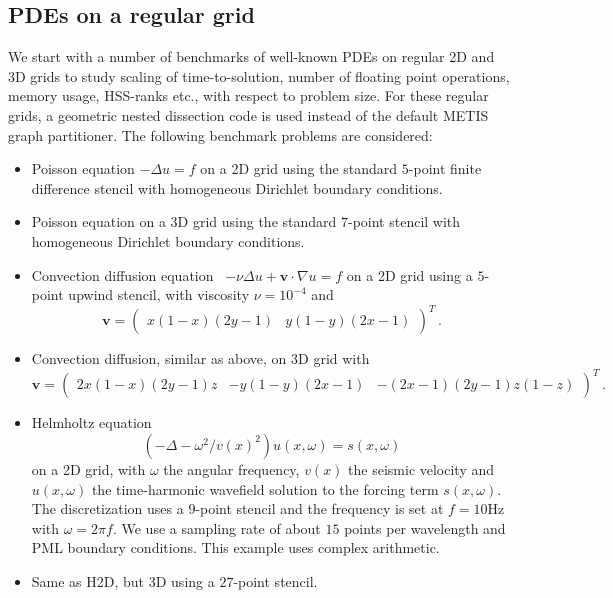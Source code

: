 \documentclass{article}
\begin{document}
\subsection{PDEs on a regular grid}\label{sec:exp_pde}
We start with a number of benchmarks of well-known PDEs on regular 2D
and 3D grids to study scaling of time-to-solution, number of floating
point operations, memory usage, HSS-ranks etc., with respect to
problem size. For these regular grids, a geometric nested dissection
code is used instead of the default METIS graph partitioner. The
following benchmark problems are considered:
\begin{itemize}
\item Poisson equation $-\Delta u = f$ on a 2D grid using the standard
  $5$-point finite difference stencil with homogeneous Dirichlet
  boundary conditions.
\item Poisson equation on a 3D grid using the standard $7$-point
  stencil with homogeneous Dirichlet boundary conditions.
\item Convection diffusion equation~\cite{agmg} $-\nu \Delta u +
  \mathbf{v} \cdot \nabla u = f$ on a 2D grid using a $5$-point upwind
  stencil, with viscosity $\nu = 10^{-4}$ and
  \begin{equation}
    \mathbf{v} = \begin{pmatrix} x(1-x)(2y-1) & y(1-y)(2x-1)\end{pmatrix}^T \, .
  \end{equation}
\item Convection diffusion, similar as above, on 3D grid with
  \begin{equation}
    \mathbf{v} = \begin{pmatrix}  2x(1-x)(2y-1)z & -y(1-y)(2x-1) & -(2x-1)(2y-1)z(1-z) \end{pmatrix}^T \, .
  \end{equation}
\item Helmholtz equation
  \begin{equation}
    \left( -\Delta - \omega^2 / v(x)^2 \right) u(x,\omega) = s(x, \omega)
  \end{equation}
  on a 2D grid, with $\omega$ the angular frequency, $v(x)$ the
  seismic velocity and $u(x,\omega)$ the time-harmonic wavefield
  solution to the forcing term $s(x,\omega)$. The discretization uses
  a $9$-point stencil and the frequency is set at $f = 10$Hz with
  $\omega = 2 \pi f$. We use a sampling rate of about $15$ points per
  wavelength and PML boundary conditions. This example uses complex
  arithmetic.
\item Same as H2D, but 3D using a $27$-point stencil.
\end{itemize}
\end{document}
